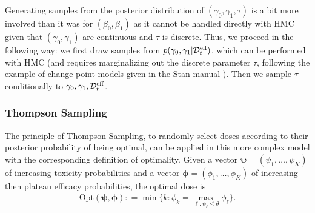 
Generating samples from the posterior distribution of $(\gamma_0,\gamma_1,\tau)$ is a bit more involved than it was for $(\beta_0,\beta_1)$ as it cannot be handled directly with HMC given that $(\gamma_0,\gamma_1)$ are continuous and $\tau$ is discrete. Thus, we proceed in the following way: we first draw samples from $p(\gamma_0,\gamma_1 |\mathcal{D}^{\text{eff}}_t)$, which can be performed with HMC (and requires marginalizing out the discrete parameter $\tau$, following the example of change point models given in the Stan manual \citep{StanManual}). Then we sample $\tau$ conditionally to $\gamma_0,\gamma_1,\mathcal{D}^{\text{eff}}_t$.


\subsubsection{Thompson Sampling}

The principle of Thompson Sampling, to randomly select doses according to their posterior probability of being optimal, can be applied in this more complex model with the corresponding definition of optimality. Given a vector $\bm\psi = (\psi_1,\dots,\psi_K)$ of increasing toxicity probabilities and a vector $\bm\phi = (\phi_1,\dots,\phi_K)$ of increasing then plateau efficacy probabilities, the optimal dose is 
\begin{align}\label{optEmp}
{\mathrm{Opt}}(\bm{\psi},\bm{\phi}) : = \min\Big\{
    k : \phi_k = \max_{\ell : \psi_\ell \leq \theta} \phi_\ell \Big\}.
\end{align}

